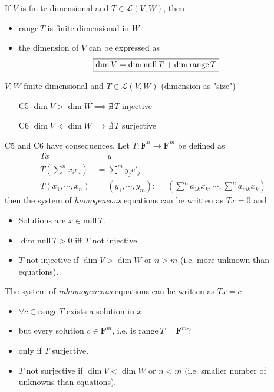 \documentclass[11pt,notitlepage,oneside]{article}
\DeclareMathOperator{\dimension}{dim}
\newcommand{\nullspace}[1]{\mathrm{null}\,{#1}}
\newcommand{\rangespace}[1]{\mathrm{range}\,{#1}}
\newcommand{\eqdef}{\mathrel{\mathop:}=}
\begin{document}
\begin{description}
  \item[T4] If $V$ is finite dimensional and $T\in\mathcal{L}(V,W)$, then
  \begin{itemize}
  \item $\rangespace{T}$ is finite dimensional in $W$
  \item the dimension of $V$ can be expressed as
  \begin{align*}
  \Aboxed{\dim{V} = \dimension{\nullspace{T}} + \dimension{\rangespace{T}}}
  \end{align*}
  \end{itemize}
  \item $V,W$ finite dimensional and $T\in\mathcal{L}(V,W)$ (dimension as "size")
  \begin{itemize}
  \item[C5] $\dimension{V} > \dimension{W} \implies \nexists\,T$ injective
  \item[C6] $\dimension{V} < \dimension{W} \implies \nexists\,T$ surjective
  \end{itemize}
  \item [Theory of linear equations] C5 and C6 have consequences. Let $T:\mathbf{F}^n\to\mathbf{F}^m$ be defined as 
  \begin{align*}
  Tx &= y \\
  T(\sum^n x_i e_i) &= \sum^m y_j e'_j \\
  T(x_1,\cdots,x_n) &= (y_1,\cdots,y_m) \eqdef (\sum^n a_{1k}x_k, \cdots,\sum^n a_{mk}x_k)
  \end{align*}
  then the system of \emph{homogeneous} equations can be written as $Tx=0$ and
  \begin{itemize}
  \item Solutions are $x\in\nullspace{T}$.
  \item $\dimension{\nullspace{T}}>0$ iff $T$ not injective.
  \item  $T$ not injective if $\dimension{V} > \dimension{W}$ or $n>m$ (i.e. more unknown than equations).
  \end{itemize}
  The system of \emph{inhomogeneous} equations can be written as $Tx=c$
  \begin{itemize}
  \item $\forall c\in\rangespace{T}$ exists a solution in $x$
  \item but every solution $c\in \mathbf{F}^m$, i.e. is $\rangespace{T}=\mathbf{F}^m$?
  \item only if $T$ surjective.
  \item $T$ not surjective if $\dimension{V} < \dimension{W}$ or $n<m$ (i.e. smaller number of unknowns than equations).

\end{itemize}
\end{description}
\end{document}
